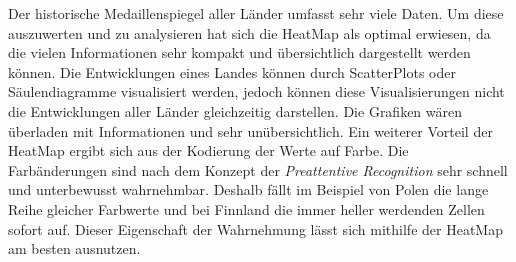 Der historische Medaillenspiegel aller Länder umfasst sehr viele Daten. Um diese auszuwerten und zu analysieren hat sich die HeatMap als optimal erwiesen, da die vielen Informationen sehr kompakt und übersichtlich dargestellt werden können. Die Entwicklungen eines Landes können durch ScatterPlots oder Säulendiagramme visualisiert werden, jedoch können diese Visualisierungen nicht die Entwicklungen aller Länder gleichzeitig darstellen. Die Grafiken wären überladen mit Informationen und sehr unübersichtlich. Ein weiterer Vorteil der HeatMap ergibt sich aus der Kodierung der Werte auf Farbe. Die Farbänderungen sind nach dem Konzept der \textit{Preattentive Recognition} \cite{preAttent} sehr schnell und unterbewusst wahrnehmbar. Deshalb fällt im Beispiel von Polen die lange Reihe gleicher Farbwerte und bei Finnland die immer heller werdenden Zellen sofort auf. Dieser Eigenschaft der Wahrnehmung lässt sich mithilfe der HeatMap am besten ausnutzen.